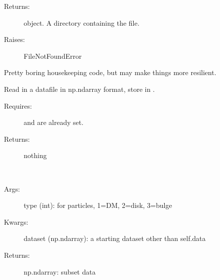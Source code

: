 \documentclass[letterpaper,10pt,english]{sphinxmanual}
\begin{document}
\begin{fulllineitems}
\begin{fulllineitems}
\begin{description}
\item[{Returns:   }] \leavevmode
{} object. A directory containing the file.

\item[{Raises:}] \leavevmode
FileNotFoundError

\end{description}

Pretty boring housekeeping code, but may make things more resilient.

\end{fulllineitems}


\begin{fulllineitems}
\label{\detokenize{galaxy:galaxy.galaxy.Galaxy.read_file}}
Read in a datafile in np.ndarray format, store in .
\begin{description}
\item[{Requires:}] \leavevmode
{} and  are already set.

\item[{Returns: }] \leavevmode
nothing

\end{description}

\end{fulllineitems}


\begin{fulllineitems}
\label{\detokenize{galaxy:galaxy.galaxy.Galaxy.filter_by_type}}~\begin{description}
\item[{Args:}] \leavevmode
type (int): for particles, 1=DM, 2=disk, 3=bulge

\item[{Kwargs:}] \leavevmode
dataset (np.ndarray): a starting dataset other than self.data

\item[{Returns: }] \leavevmode
np.ndarray: subset data

\end{description}


\end{fulllineitems}
\end{fulllineitems}
\end{document}
